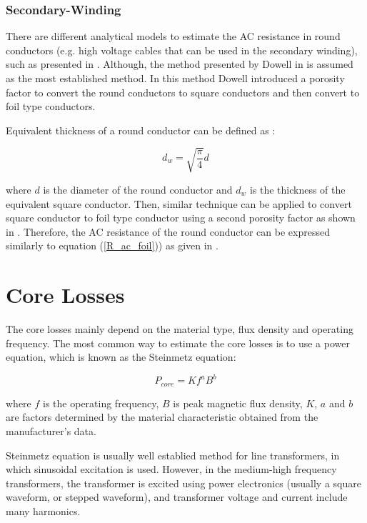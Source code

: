 \documentclass[a4paper, 11pt]{article} %
\begin{document}
\subsubsection{Secondary-Winding}

There are different analytical models to estimate the AC resistance in round conductors (e.g. high voltage cables that can be used in the secondary winding), such as presented in \cite{Sullivan2003,Ferreira1994}. Although, the method presented by Dowell in \cite{Dowell1966} is assumed as the most established method. In this method Dowell introduced a porosity factor to convert the round conductors to square conductors and then convert to foil type conductors.

Equivalent thickness of a round conductor can be defined as \cite{Dowell1966}:

\begin{equation}
 d_w =  \sqrt{\frac{\pi}{4}} d 

 \end{equation}

where $d$ is the diameter of the round conductor and $d_w$ is the thickness of the equivalent square conductor. Then, similar technique can be applied to convert square conductor to foil type conductor using a second porosity factor as shown in \cite{Villar2010}. Therefore, the AC resistance of the round conductor can be expressed similarly to equation (\ref{R_ac_foil})) as given in \cite{Villar2010}.


\section{Core Losses}

The core losses mainly depend on the material type, flux density and operating frequency. The most common way to estimate the core losses is to use a power equation, which is known as the Steinmetz equation:

\begin{equation}
 P_{core} = K f^a B^b
\end{equation}

where $f$ is the operating frequency, $B$ is peak magnetic flux density, $K$, $a$ and $b$ are factors determined by the material characteristic obtained from the manufacturer's data.

Steinmetz equation is usually well establied method for line transformers, in which sinusoidal excitation is used. However, in the medium-high frequency transformers, the transformer is excited using power electronics (usually a square waveform, or stepped waveform), and transformer voltage and current include many harmonics.
\end{document}
